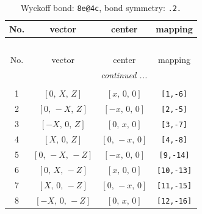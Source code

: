 \documentclass[fleqn,8pt]{jsarticle}
\begin{document}
\begin{longtable}{cccc}
\caption{Wyckoff bond: {\tt 8e@4c}, bond symmetry: {\tt .2.}}
 \\
 \hline \hline
No. & vector & center & mapping \\ \hline \endfirsthead

\multicolumn{3}{l}{\tablename\ \thetable{}} \\
 \hline \hline
No. & vector & center & mapping \\ \hline \endhead

 \hline \hline
\multicolumn{3}{r}{\footnotesize\it continued ...} \\ \endfoot

 \hline \hline
\multicolumn{3}{r}{} \\ \endlastfoot

1 & $\left[ 0,\, X,\, Z \right]$ & $\left[ x,\, 0,\, 0 \right]$ & {\tt [1,-6]} \\ \hline
2 & $\left[ 0,\, - X,\, Z \right]$ & $\left[ - x,\, 0,\, 0 \right]$ & {\tt [2,-5]} \\ \hline
3 & $\left[ - X,\, 0,\, Z \right]$ & $\left[ 0,\, x,\, 0 \right]$ & {\tt [3,-7]} \\ \hline
4 & $\left[ X,\, 0,\, Z \right]$ & $\left[ 0,\, - x,\, 0 \right]$ & {\tt [4,-8]} \\ \hline
5 & $\left[ 0,\, - X,\, - Z \right]$ & $\left[ - x,\, 0,\, 0 \right]$ & {\tt [9,-14]} \\ \hline
6 & $\left[ 0,\, X,\, - Z \right]$ & $\left[ x,\, 0,\, 0 \right]$ & {\tt [10,-13]} \\ \hline
7 & $\left[ X,\, 0,\, - Z \right]$ & $\left[ 0,\, - x,\, 0 \right]$ & {\tt [11,-15]} \\ \hline
8 & $\left[ - X,\, 0,\, - Z \right]$ & $\left[ 0,\, x,\, 0 \right]$ & {\tt [12,-16]} \\
\end{longtable}
\renewcommand{\arraystretch}{1.2}
\end{document}
